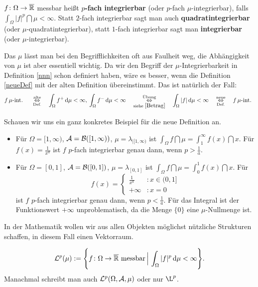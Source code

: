 \begin{deff}\label{neueDef}
	$f \colon \Omega \to \overline{\mathbb{R}}$ messbar heißt \textbf{$p$-fach integrierbar} (oder $p$-fach $\mu$-integrierbar), falls $ \int_{\Omega} |f|^p \dint \mu < \infty$. Statt $2$-fach integrierbar sagt man auch \textbf{quadratintegrierbar} (oder $\mu$-quadratintegrierbar), statt $1$-fach integrierbar sagt man \textbf{integrierbar} (oder $\mu$-integrierbar). 
\end{deff}
Das $\mu$ l\"asst man bei den Begrifflichkeiten oft aus Faulheit weg, die Abh\"angigkeit von $\mu$ ist aber essentiell wichtig. Da wir den Begriff der $\mu$-Integrierbarkeit in Definition \ref{nnn} schon definiert haben, w\"are es besser, wenn die Definition \ref{neueDef} mit der alten Definition \"ubereinstimmt. Das ist nat\"urlich der Fall:
	\begin{gather*}
	f\,\mu\text{-int. } \quad\overset{\text{alte}}{\underset{\text{Def.}}{\Leftrightarrow}} \quad\int_{\Omega} f^+ \, \mathrm{d} \mu < \infty, \: \int_{\Omega} f^- \, \mathrm{d} \mu < \infty \quad\overset{\text{\"Ubung}}{\underset{\text{siehe }  \eqref{Betrag}}{\Leftrightarrow}} \quad\int_{\Omega} |f| \, \mathrm{d} \mu < \infty \quad \overset{\text{neue}}{\underset{\text{Def.}}{\Leftrightarrow}} \quad f\,\mu\text{-int. }
	\end{gather*}

Schauen wir uns ein ganz konkretes Beispiel f\"ur die neue Definition an. 
\begin{beispiel}  \abs

	\begin{itemize}
		\item Für $\Omega = [1, \infty)$, $\mathcal{A} = \mathcal{B}([1,\infty))$, $ \mu = \lambda_{|[1, \infty)}$ ist $ \int_{\Omega} f \dint \mu = \int_{1}^{\infty} f(x)\dint x$. Für $f(x) = \frac{1}{x^a}$ ist $f$ $p$-fach integrierbar genau dann, wenn $p > \frac{1}{a}$.
		\item Für $\Omega = [0, 1]$, $\mathcal{A} = \mathcal{B}([0, 1])$, $ \mu = \lambda_{[0, 1]}$ ist $ \int_{\Omega} f \dint \mu = \int_{0}^{1} f(x)\dint x$. Für 
		\[ f(x) = \begin{cases}
		\frac{1}{x^a}&:x \in (0,1]\\
		+ \infty&:x = 0
		\end{cases} \]
		ist $f$ $p$-fach integrierbar genau dann, wenn $p < \frac{1}{a}$. F\"ur das Integral ist der Funktionswert $+\infty$ unproblematisch, da die Menge $\{0\}$ eine $\mu$-Nullmenge ist.
	\end{itemize}
\end{beispiel}
In der Mathematik wollen wir aus allen Objekten m\"oglichst n\"utzliche Strukturen schaffen, in diesem Fall einen Vektorraum.
\begin{deff}
	\[ \mathcal{L}^p(\mu) := \Bigg\{ f \colon \Omega \to \overline{\mathbb{R}}\text{ messbar}\, \Big|\, \int_{\Omega} |f|^p \, \mathrm{d} \mu < \infty \Bigg\}. \]
	Manachmal schreibt man auch $\mathcal{L}^p(\Omega, \mathcal{A}, \mu)$ oder nur $\L^p$.
\end{deff}

